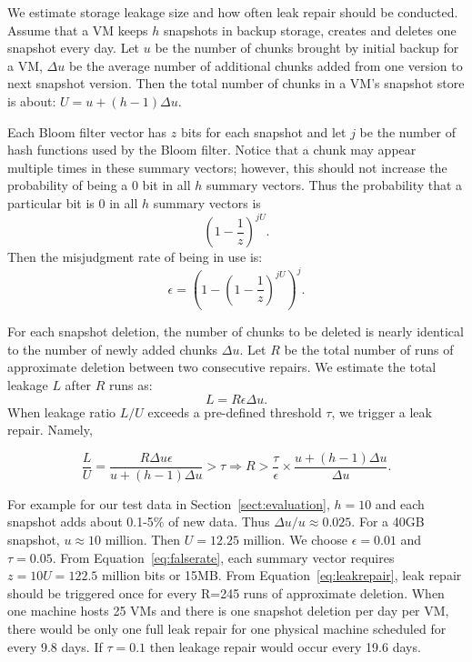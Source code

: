 \begin{itemize}
\end{itemize}

We estimate storage leakage size and how often leak repair should be conducted.
Assume that  a VM keeps $h$ snapshots in backup storage, creates and deletes one snapshot
every day. Let $u$ be the number of chunks brought by initial backup for a VM, $\Delta u$ be the average
number of additional chunks added from one version to next snapshot version. Then the total number of 
chunks in a VM's snapshot store is about:
$
U = u + (h-1)\Delta u.
$

Each Bloom filter vector has  $z$ bits for each snapshot and let $j$ be the number of hash functions used by the
Bloom filter.  Notice that a chunk may appear multiple times in these summary vectors; however, this should not 
increase the probability of being a 0 bit in all $h$ summary vectors.
Thus the probability that a particular bit is 0  in all $h$ summary vectors is  
\[
(1- \frac{1}{z}) ^{j U}.
\] 
Then the misjudgment rate of being in use  is: 
\begin{equation}
\label{eq:falserate}
\epsilon = (1-(1-\frac{1}{z})^{jU})^j.
\end{equation}

For each snapshot deletion, the number of chunks to be deleted is nearly identical to the number of
newly added chunks $\Delta u$. 
Let $R$ be the total number of runs of approximate deletion between two consecutive 
repairs. We estimate  the total leakage $L$ after $R$ runs as:
\[
L = R \epsilon \Delta u.
\]
When leakage ratio $L/U$ exceeds a pre-defined threshold $\tau$, we trigger a leak repair. Namely,

\begin{equation}
\label{eq:leakrepair}
\frac{L}{U} = \frac{R \Delta u \epsilon}{u+(h-1)\Delta u } > \tau 
\Longrightarrow R > \frac{\tau}{\epsilon}\times\frac{u + (h-1)\Delta u}{\Delta u}.
\end{equation}

For example for our test data in Section~\ref{sect:evaluation},  
$h=10$ and each snapshot adds
about 0.1-5\% of new data. Thus ${\Delta u}/{u} \approx 0.025$. For a 40GB snapshot, $u\approx  10$ million.
Then $U=12.25$ million.
We choose  $\epsilon = 0.01$ and $\tau=0.05$.  From Equation~\ref{eq:falserate}, 
each summary vector requires $z=10U=122.5$ million bits or 15MB. From Equation~\ref{eq:leakrepair}, 
leak repair should be triggered once for every R=245 runs of approximate deletion. 
When one machine hosts 25 VMs and there is one snapshot deletion per day per VM, there would be 
only one full leak repair for one physical machine scheduled for every 9.8 days. 
If $\tau = 0.1$ then leakage repair would occur every 19.6 days.

